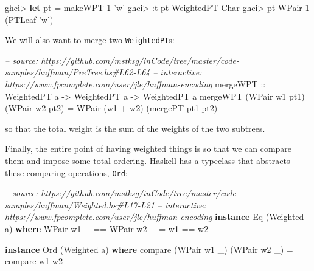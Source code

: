 \documentclass[]{article}
\newenvironment{Shaded}{}{}
\newcommand{\KeywordTok}[1]{\textcolor[rgb]{0.00,0.44,0.13}{\textbf{#1}}}
\newcommand{\DataTypeTok}[1]{\textcolor[rgb]{0.56,0.13,0.00}{#1}}
\newcommand{\DecValTok}[1]{\textcolor[rgb]{0.25,0.63,0.44}{#1}}
\newcommand{\CharTok}[1]{\textcolor[rgb]{0.25,0.44,0.63}{#1}}
\newcommand{\CommentTok}[1]{\textcolor[rgb]{0.38,0.63,0.69}{\textit{#1}}}
\newcommand{\OtherTok}[1]{\textcolor[rgb]{0.00,0.44,0.13}{#1}}
\newcommand{\FunctionTok}[1]{\textcolor[rgb]{0.02,0.16,0.49}{#1}}
\newcommand{\NormalTok}[1]{#1}
\begin{document}
\begin{Shaded}
\begin{Highlighting}[]
\NormalTok{ghci}\FunctionTok{>} \KeywordTok{let}\NormalTok{ pt }\FunctionTok{=}\NormalTok{ makeWPT }\DecValTok{1} \CharTok{'w'}
\NormalTok{ghci}\FunctionTok{>} \FunctionTok{:}\NormalTok{t pt}
\DataTypeTok{WeightedPT} \DataTypeTok{Char}
\NormalTok{ghci}\FunctionTok{>}\NormalTok{ pt}
\DataTypeTok{WPair} \DecValTok{1}\NormalTok{ (}\DataTypeTok{PTLeaf} \CharTok{'w'}\NormalTok{)}
\end{Highlighting}
\end{Shaded}

We will also want to merge two \texttt{WeightedPT}s:

\begin{Shaded}
\begin{Highlighting}[]
\CommentTok{-- source: https://github.com/mstksg/inCode/tree/master/code-samples/huffman/PreTree.hs#L62-L64}
\CommentTok{-- interactive: https://www.fpcomplete.com/user/jle/huffman-encoding}
\OtherTok{mergeWPT ::} \DataTypeTok{WeightedPT}\NormalTok{ a }\OtherTok{->} \DataTypeTok{WeightedPT}\NormalTok{ a }\OtherTok{->} \DataTypeTok{WeightedPT}\NormalTok{ a}
\NormalTok{mergeWPT (}\DataTypeTok{WPair}\NormalTok{ w1 pt1) (}\DataTypeTok{WPair}\NormalTok{ w2 pt2)}
    \FunctionTok{=} \DataTypeTok{WPair}\NormalTok{ (w1 }\FunctionTok{+}\NormalTok{ w2) (mergePT pt1 pt2)}
\end{Highlighting}
\end{Shaded}

so that the total weight is the sum of the weights of the two subtrees.

Finally, the entire point of having weighted things is so that we can compare
them and impose some total ordering. Haskell has a typeclass that abstracts
these comparing operations, \texttt{Ord}:

\begin{Shaded}
\begin{Highlighting}[]
\CommentTok{-- source: https://github.com/mstksg/inCode/tree/master/code-samples/huffman/Weighted.hs#L17-L21}
\CommentTok{-- interactive: https://www.fpcomplete.com/user/jle/huffman-encoding}
\KeywordTok{instance} \DataTypeTok{Eq}\NormalTok{ (}\DataTypeTok{Weighted}\NormalTok{ a) }\KeywordTok{where}
    \DataTypeTok{WPair}\NormalTok{ w1 _ }\FunctionTok{==} \DataTypeTok{WPair}\NormalTok{ w2 _ }\FunctionTok{=}\NormalTok{ w1 }\FunctionTok{==}\NormalTok{ w2}

\KeywordTok{instance} \DataTypeTok{Ord}\NormalTok{ (}\DataTypeTok{Weighted}\NormalTok{ a) }\KeywordTok{where}
\NormalTok{    compare (}\DataTypeTok{WPair}\NormalTok{ w1 _) (}\DataTypeTok{WPair}\NormalTok{ w2 _) }\FunctionTok{=}\NormalTok{ compare w1 w2}
\end{Highlighting}
\end{Shaded}
\end{document}

